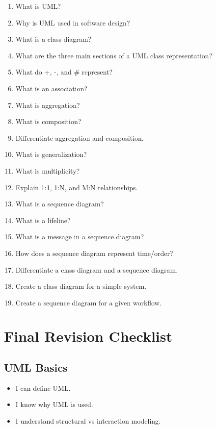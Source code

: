 \documentclass[11pt,a4paper]{article}
\newcommand{\checkitem}{$\square$}
\begin{document}
\begin{enumerate}
    \item What is UML?
    \item Why is UML used in software design?
    \item What is a class diagram?
    \item What are the three main sections of a UML class representation?
    \item What do +, -, and \# represent?
    \item What is an association?
    \item What is aggregation?
    \item What is composition?
    \item Differentiate aggregation and composition.
    \item What is generalization?
    \item What is multiplicity?
    \item Explain 1:1, 1:N, and M:N relationships.
    \item What is a sequence diagram?
    \item What is a lifeline?
    \item What is a message in a sequence diagram?
    \item How does a sequence diagram represent time/order?
    \item Differentiate a class diagram and a sequence diagram.
    \item Create a class diagram for a simple system.
    \item Create a sequence diagram for a given workflow.
\end{enumerate}

\section{Final Revision Checklist}

\subsection*{UML Basics}

\begin{itemize}[label=\checkitem]
    \item I can define UML.
    \item I know why UML is used.
    \item I understand structural vs interaction modeling.
\end{itemize}
\end{document}
